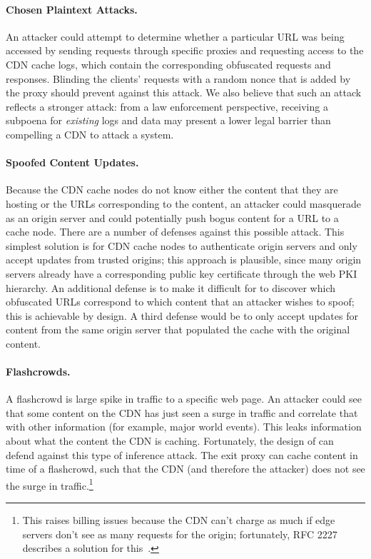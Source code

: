 \paragraph{Chosen Plaintext Attacks.} An attacker could attempt to
determine whether a particular URL was being accessed by sending requests
through specific \system{} proxies and requesting access to the CDN cache logs, 
which contain the corresponding obfuscated
requests and responses. Blinding the clients' requests
with a random nonce that is added by the proxy should prevent against this
attack. We also believe that such an attack reflects a stronger attack: from a
law enforcement perspective, receiving a subpoena for {\em existing} logs and
data may present a lower legal barrier than compelling a CDN to attack a
system.

\paragraph{Spoofed Content Updates.} Because the CDN cache
nodes do not know either the content that they are hosting or the URLs
corresponding to the content, an attacker could masquerade as an origin server
and could potentially push bogus content for a URL to a cache node. There are
a number of defenses against this possible attack. This simplest solution is
for CDN cache nodes to authenticate origin servers and only accept updates
from trusted origins; this approach is plausible, since many origin servers already
have a corresponding public key certificate through the web PKI hierarchy.  An additional
defense is to make it difficult for to discover which obfuscated URLs correspond
to which content that an attacker wishes to spoof; this is achievable by design.
A third defense would be to only accept updates for content from the same origin
server that populated the cache with the original content.

\paragraph{Flashcrowds.}  A flashcrowd is large spike in traffic to a specific web
page. An attacker
could see that some content on the CDN has just seen a surge in traffic and correlate that with 
other information (for example, major world events).  This leaks information about what the content the 
CDN is caching.  Fortunately, the design of \system{} can defend against this type of inference attack.  
The exit proxy can cache content in time of a flashcrowd, such that the CDN (and therefore the attacker) 
does not see the surge in traffic.\footnote{This raises billing issues because the CDN can’t charge as much if edge servers don’t see as many requests for the origin; fortunately, RFC 2227 describes a solution for this~\cite{rfc2227}.}  
